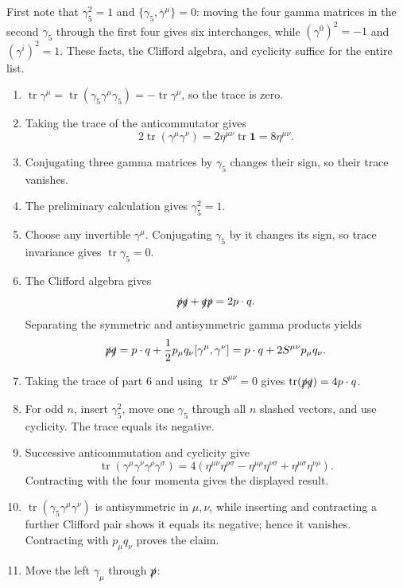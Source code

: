 \begin{enumerate}
First note that \(\gamma_5^2=1\) and
\(\{\gamma_5,\gamma^\mu\}=0\): moving the four gamma matrices in the
second \(\gamma_5\) through the first four gives six interchanges, while
\((\gamma^0)^2=-1\) and \((\gamma^i)^2=1\).  These facts, the Clifford
algebra, and cyclicity suffice for the entire list.
\begin{enumerate}
\item
\(\operatorname{tr}\gamma^\mu
=\operatorname{tr}(\gamma_5\gamma^\mu\gamma_5)
=-\operatorname{tr}\gamma^\mu\), so the trace is zero.
\item
Taking the trace of the anticommutator gives
\[
 2\operatorname{tr}(\gamma^\mu\gamma^\nu)
 =2\eta^{\mu\nu}\operatorname{tr}\mathbf1
 =8\eta^{\mu\nu}.
\]
\item
Conjugating three gamma matrices by \(\gamma_5\) changes their sign, so
their trace vanishes.
\item
The preliminary calculation gives \(\gamma_5^2=1\).
\item
Choose any invertible \(\gamma^\mu\).  Conjugating \(\gamma_5\) by it
changes its sign, so trace invariance gives
\(\operatorname{tr}\gamma_5=0\).
\item
The Clifford algebra gives
\[
 \slashed p\slashed q+\slashed q\slashed p=2p\cdot q.
\]
Separating the symmetric and antisymmetric gamma products yields
\[
 \slashed p\slashed q
 =p\cdot q+\frac12p_\mu q_\nu[\gamma^\mu,\gamma^\nu]
 =p\cdot q+2S^{\mu\nu}p_\mu q_\nu.
\]
\item
Taking the trace of part 6 and using
\(\operatorname{tr}S^{\mu\nu}=0\) gives
\(\operatorname{tr}(\slashed p\slashed q)=4p\cdot q\).
\item
For odd \(n\), insert \(\gamma_5^2\), move one \(\gamma_5\) through all
\(n\) slashed vectors, and use cyclicity.  The trace equals its negative.
\item
Successive anticommutation and cyclicity give
\[
\operatorname{tr}(\gamma^\mu\gamma^\nu\gamma^\rho\gamma^\sigma)
=4(\eta^{\mu\nu}\eta^{\rho\sigma}
-\eta^{\mu\rho}\eta^{\nu\sigma}
+\eta^{\mu\sigma}\eta^{\nu\rho}).
\]
Contracting with the four momenta gives the displayed result.
\item
\(\operatorname{tr}(\gamma_5\gamma^\mu\gamma^\nu)\) is antisymmetric in
\(\mu,\nu\), while inserting and contracting a further Clifford pair
shows it equals its negative; hence it vanishes.  Contracting with
\(p_\mu q_\nu\) proves the claim.
\item
Move the left \(\gamma_\mu\) through \(\slashed p\):

\end{enumerate}
\end{enumerate}
